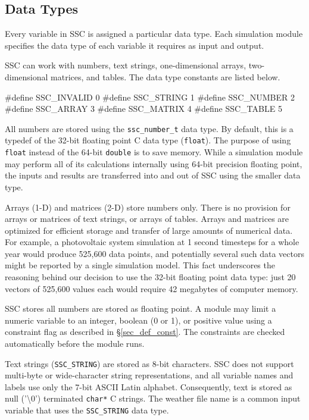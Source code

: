 \documentclass{article}
\begin{document}
\subsection{Data Types}

Every variable in SSC is assigned a particular data type. Each simulation module specifies the data type of each variable it requires as input and output.

SSC can work with numbers, text strings, one-dimensional arrays, two-dimensional matrices, and tables. The data type constants are listed below.

\begin{verbatimtab}
#define SSC_INVALID 0
#define SSC_STRING 1
#define SSC_NUMBER 2
#define SSC_ARRAY 3
#define SSC_MATRIX 4
#define SSC_TABLE 5
\end{verbatimtab}

All numbers are stored using the \texttt{ssc\_number\_t} data type.  By default, this is a typedef of the 32-bit floating point C data type (\texttt{float}).  The purpose of using \texttt{float} instead of the 64-bit \texttt{double} is to save memory.  While a simulation module may perform all of its calculations internally using 64-bit precision floating point, the inputs and results are transferred into and out of SSC using the smaller data type.

Arrays (1-D) and matrices (2-D) store numbers only. There is no provision for arrays or matrices of text strings, or arrays of tables.  Arrays and matrices are optimized for efficient storage and transfer of large amounts of numerical data.  For example, a photovoltaic system simulation at 1 second timesteps for a whole year would produce 525,600 data points, and potentially several such data vectors might be reported by a single simulation model.  This fact underscores the reasoning behind our decision to use the 32-bit floating point data type: just 20 vectors of 525,600 values each would require 42 megabytes of computer memory.

SSC stores all numbers are stored as floating point. A module may limit a numeric variable to an integer, boolean (0 or 1), or positive value using a constraint flag as described in \S\ref{sec_def_const}. The constraints are checked automatically before the module runs.

Text strings (\texttt{SSC\_STRING})  are stored as 8-bit characters.  SSC does not support multi-byte or wide-character string representations, and all variable names and labels use only the 7-bit ASCII Latin alphabet.  Consequently, text is stored as null ('\textbackslash 0') terminated \texttt{char*} C strings.  The weather file name is a common input variable that uses the \texttt{SSC\_STRING} data type.
\end{document}
